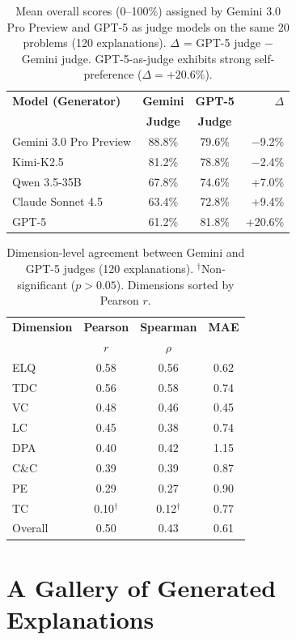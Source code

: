 \documentclass[11pt]{article}
\begin{document}
\begin{table}[H]
\centering
\small
\begin{tabular}{lccr}
\hline
\textbf{Model (Generator)} & \textbf{Gemini} & \textbf{GPT-5} & \textbf{$\Delta$} \\
 & \textbf{Judge} & \textbf{Judge} & \\
\hline
Gemini 3.0 Pro Preview & 88.8\% & 79.6\% & $-$9.2\% \\
Kimi-K2.5              & 81.2\% & 78.8\% & $-$2.4\% \\
Qwen 3.5-35B           & 67.8\% & 74.6\% & +7.0\% \\
Claude Sonnet 4.5      & 63.4\% & 72.8\% & +9.4\% \\
GPT-5                  & 61.2\% & 81.8\% & +20.6\% \\
\hline
\end{tabular}
\caption{Mean overall scores (0--100\%) assigned by Gemini 3.0 Pro Preview and GPT-5 as judge models on the same 20 problems (120 explanations). $\Delta$ = GPT-5 judge $-$ Gemini judge. GPT-5-as-judge exhibits strong self-preference ($\Delta{=}+20.6\%$).}
\label{tab:judge-bias}
\end{table}

\begin{table}[H]
\centering
\small
\begin{tabular}{lccc}
\hline
\textbf{Dimension} & \textbf{Pearson} & \textbf{Spearman} & \textbf{MAE} \\
 & \textbf{$r$} & \textbf{$\rho$} & \\
\hline
ELQ & 0.58 & 0.56 & 0.62 \\
TDC & 0.56 & 0.58 & 0.74 \\
VC  & 0.48 & 0.46 & 0.45 \\
LC  & 0.45 & 0.38 & 0.74 \\
DPA & 0.40 & 0.42 & 1.15 \\
C\&C & 0.39 & 0.39 & 0.87 \\
PE  & 0.29 & 0.27 & 0.90 \\
TC  & 0.10$^{\dag}$ & 0.12$^{\dag}$ & 0.77 \\
Overall & 0.50 & 0.43 & 0.61 \\
\hline
\end{tabular}
\caption{Dimension-level agreement between Gemini and GPT-5 judges (120 explanations). $^{\dag}$Non-significant ($p > 0.05$). Dimensions sorted by Pearson $r$.}
\label{tab:judge-dim}
\end{table}


\section{A Gallery of Generated Explanations}
\label{sec:gallery}
\end{document}
